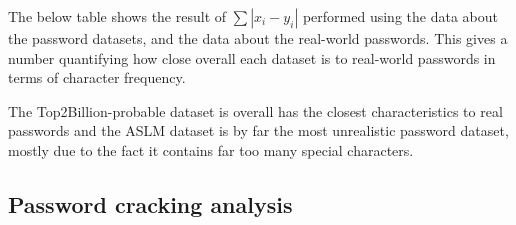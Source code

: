 \documentclass[11pt]{article}
\begin{document}
The below table shows the result of $\sum{|x_i-y_i|}$ performed using the data about the password datasets, and the data about the real-world passwords. This gives a number quantifying how close overall each dataset is to real-world passwords in terms of character frequency.
\begin{center}
\end{center}
The Top2Billion-probable dataset is overall has the closest characteristics to real passwords and the ASLM dataset is by far the most unrealistic password dataset, mostly due to the fact it contains far too many special characters.


\subsection{Password cracking analysis} \label{crack}
\end{document}
